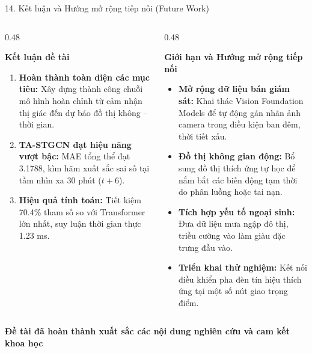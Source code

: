 \documentclass[aspectratio=169,10pt]{beamer}
\newcommand{\badge}[2]{\colorbox{#1!15}{\textcolor{#1}{\textbf{\scriptsize #2}}}}
\begin{document}
\begin{frame}{14. Kết luận và Hướng mở rộng tiếp nối (Future Work)}
  \begin{columns}[T]
    \begin{column}{0.48\textwidth}
      \begin{block}{\textbf{Kết luận đề tài}}
        \scriptsize
        \begin{enumerate}
          \item \textbf{Hoàn thành toàn diện các mục tiêu:} Xây dựng thành công chuỗi mô hình hoàn chỉnh từ cảm nhận thị giác đến dự báo đồ thị không -- thời gian.
          \item \textbf{TA-STGCN đạt hiệu năng vượt bậc:} MAE tổng thể đạt 3.1788, kìm hãm xuất sắc sai số tại tầm nhìn xa 30 phút ($t+6$).
          \item \textbf{Hiệu quả tính toán:} Tiết kiệm 70.4\% tham số so với Transformer lớn nhất, suy luận thời gian thực 1.23 ms.
        \end{enumerate}
      \end{block}
    \end{column}

    \begin{column}{0.48\textwidth}
      \begin{exampleblock}{\textbf{Giới hạn và Hướng mở rộng tiếp nối}}
        \scriptsize
        \begin{itemize}
          \item \textbf{Mở rộng dữ liệu bán giám sát:} Khai thác Vision Foundation Models để tự động gán nhãn ảnh camera trong điều kiện ban đêm, thời tiết xấu.
          \item \textbf{Đồ thị không gian động:} Bổ sung đồ thị thích ứng tự học để nắm bắt các biến động tạm thời do phân luồng hoặc tai nạn.
          \item \textbf{Tích hợp yếu tố ngoại sinh:} Đưa dữ liệu mưa ngập đô thị, triều cường vào làm giàu đặc trưng đầu vào.
          \item \textbf{Triển khai thử nghiệm:} Kết nối điều khiển pha đèn tín hiệu thích ứng tại một số nút giao trọng điểm.
        \end{itemize}
      \end{exampleblock}
    \end{column}
  \end{columns}
  \vskip 6pt
  \centering
  \badge{ptitblue}{\textbf{Đề tài đã hoàn thành xuất sắc các nội dung nghiên cứu và cam kết khoa học}}
\end{frame}
\end{document}
